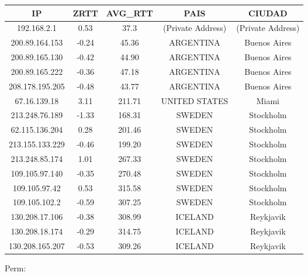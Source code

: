 \begin{tabular}{|c@{\hspace{5ex}}c@{\hspace{5ex}}c@{\hspace{5ex}}c@{\hspace{5ex}}c|}
 \hline
 \rule{0pt}{1.2em}IP & ZRTT & AVG\_RTT & PAIS & CIUDAD\\[0.2em]
 \hline

\rule{0pt}{1.2em} 192.168.2.1  &  0.53 & 37.3 & (Private Address) & (Private Address) \\[0.2em]
\rule{0pt}{1.2em} 200.89.164.153  &  -0.24 & 45.36 & ARGENTINA & Buenos Aires \\[0.2em]
\rule{0pt}{1.2em} 200.89.165.130  &  -0.42 & 44.90 & ARGENTINA & Buenos Aires \\[0.2em]
\rule{0pt}{1.2em} 200.89.165.222  &  -0.36 & 47.18 & ARGENTINA & Buenos Aires \\[0.2em]
\rule{0pt}{1.2em} 208.178.195.205  &  -0.48 & 43.77 & ARGENTINA & Buenos Aires \\[0.2em]
\rule{0pt}{1.2em} 67.16.139.18  &  3.11 & 211.71 & UNITED STATES & Miami \\[0.2em]
\rule{0pt}{1.2em} 213.248.76.189  &  -1.33 & 168.31 & SWEDEN & Stockholm \\[0.2em]
\rule{0pt}{1.2em} 62.115.136.204  &  0.28 & 201.46 & SWEDEN & Stockholm \\[0.2em]
\rule{0pt}{1.2em} 213.155.133.229  &  -0.46 & 199.20 & SWEDEN & Stockholm \\[0.2em]
\rule{0pt}{1.2em} 213.248.85.174  &  1.01 & 267.33 & SWEDEN & Stockholm \\[0.2em]
\rule{0pt}{1.2em} 109.105.97.140  &  -0.35 & 270.48 & SWEDEN & Stockholm \\[0.2em]
\rule{0pt}{1.2em} 109.105.97.42  &  0.53 & 315.58 & SWEDEN & Stockholm \\[0.2em]
\rule{0pt}{1.2em} 109.105.102.2  &  -0.59 & 307.25 & SWEDEN & Stockholm \\[0.2em]
\rule{0pt}{1.2em} 130.208.17.106  &  -0.38 & 308.99 & ICELAND & Reykjavik \\[0.2em]
\rule{0pt}{1.2em} 130.208.18.174  &  -0.29 & 314.75 & ICELAND & Reykjavik \\[0.2em]
\rule{0pt}{1.2em} 130.208.165.207  &  -0.53 & 309.26 & ICELAND & Reykjavik \\[0.2em]
\hline
 \end{tabular}

Perm:

